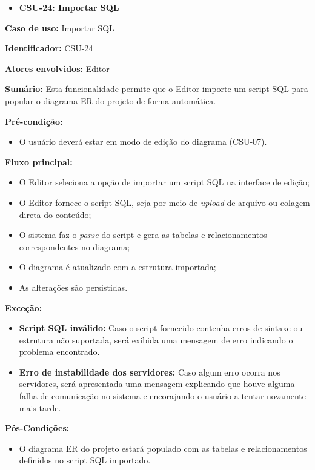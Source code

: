 \vspace{1em}

\begin{itemize}
    \item \textbf{CSU-24: Importar SQL}
\end{itemize}

\textbf{Caso de uso:} Importar SQL

\textbf{Identificador:} CSU-24

\textbf{Atores envolvidos:} Editor

\textbf{Sumário:} Esta funcionalidade permite que o Editor importe um script SQL para popular o diagrama ER do projeto de forma automática.

\textbf{Pré-condição:}
\begin{itemize}
    \item O usuário deverá estar em modo de edição do diagrama (CSU-07).
\end{itemize}

\textbf{Fluxo principal:}
\begin{itemize}
    \item O Editor seleciona a opção de importar um script SQL na interface de edição;
    \item O Editor fornece o script SQL, seja por meio de \textit{upload} de arquivo ou colagem direta do conteúdo;
    \item O sistema faz o \textit{parse} do script e gera as tabelas e relacionamentos correspondentes no diagrama;
    \item O diagrama é atualizado com a estrutura importada;
    \item As alterações são persistidas.
\end{itemize}

\textbf{Exceção:}
\begin{itemize}
    \item \textbf{Script SQL inválido:} Caso o script fornecido contenha erros de sintaxe ou estrutura não suportada, será exibida uma mensagem de erro indicando o problema encontrado.
    \item \textbf{Erro de instabilidade dos servidores:} Caso algum erro ocorra nos servidores, será apresentada uma mensagem explicando que houve alguma falha de comunicação no sistema e encorajando o usuário a tentar novamente mais tarde.
\end{itemize}

\textbf{Pós-Condições:}
\begin{itemize}
    \item O diagrama ER do projeto estará populado com as tabelas e relacionamentos definidos no script SQL importado.
\end{itemize}
